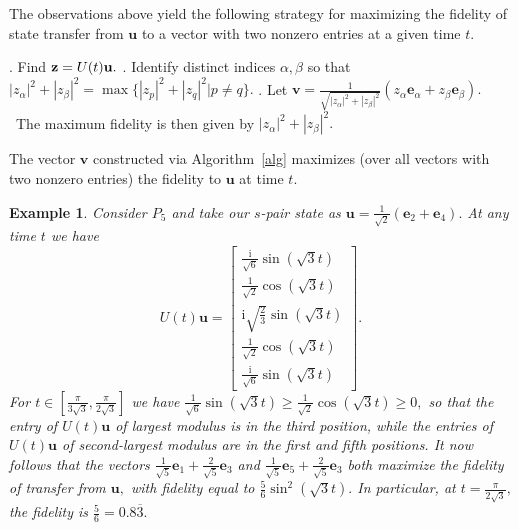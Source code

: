 \documentclass{article}
\numberwithin{equation}{section}
\newtheorem{ex}[lemma]{Example}
\newcommand{\be}{\mathbf e}
\newcommand{\bu}{\mathbf u}
\newcommand{\bv}{\mathbf v}
\def\ii{\mathrm{i}}
\begin{document}
{The observations above yield the following strategy for maximizing the fidelity of state transfer from $\bu$ to a vector with two nonzero entries at a given time $t$.

\begin{algorithm}
\caption{An algorithm to maximize fidelity}\label{alg}
\begin{algorithmic}
. Find ${\bf{z}}=U(t)\bu.$
. Identify distinct indices $\alpha, \beta$ so that $|z_\alpha|^2+ |z_\beta|^2 = \max\{ |z_p|^2+ |z_q|^2|p \ne q\}. $ 
. Let  $\bv=\frac{1}{\sqrt{|z_\alpha|^2+ |z_\beta|^2}}  (z_\alpha \be_\alpha +z_\beta \be_\beta).$ 
\State \ The maximum fidelity is then given by $|z_\alpha|^2+ |z_\beta|^2.$
\end{algorithmic}
\end{algorithm}
The vector $\bv$ constructed via Algorithm~\ref{alg} maximizes (over all vectors with two nonzero entries) the fidelity to $\bu$ at time $t.$

\begin{ex}{\rm{
Consider $P_5$ and take our $s$-pair state as $\bu= \frac{1}{\sqrt{2}}(\be_2+\be_4).$ At any time $t$ we have $$U(t)\bu = \begin{bmatrix}
    \frac{\ii}{\sqrt{6}} \sin(\sqrt{3}t)\\
    \frac{1}{\sqrt{2}} \cos(\sqrt{3}t)\\
    \ii\sqrt{\frac{2}{3}} \sin(\sqrt{3}t)\\
    \frac{1}{\sqrt{2}} \cos(\sqrt{3}t)\\
    \frac{\ii}{\sqrt{6}} \sin(\sqrt{3}t)
\end{bmatrix}.$$ 
For $t\in [\frac{\pi}{3\sqrt{3}}, \frac{\pi}{2\sqrt{3}}]$ we have $\frac{1}{\sqrt{6}} \sin(\sqrt{3}t) \ge \frac{1}{\sqrt{2}} \cos(\sqrt{3}t) \ge 0,$ so that the entry of 
$U(t)\bu$ of largest modulus is in the third position, while 
the entries of 
$U(t)\bu$ of second-largest modulus are in the first and fifth  positions. It now follows that the vectors $\frac{1}{\sqrt{5}}\be_1 +\frac{2}{\sqrt{5}}\be_3 $ and $\frac{1}{\sqrt{5}}\be_5 +\frac{2}{\sqrt{5}}\be_3 $ both maximize the fidelity of transfer from $\bu,$ with fidelity equal to $\frac{5}{6}\sin^2(\sqrt{3}t).$ In particular, at $t=\frac{\pi}{2\sqrt{3}},$ the fidelity is $\frac{5}{6}=0.8\overline{3}.$ }}
\end{ex}

}
\end{document}
